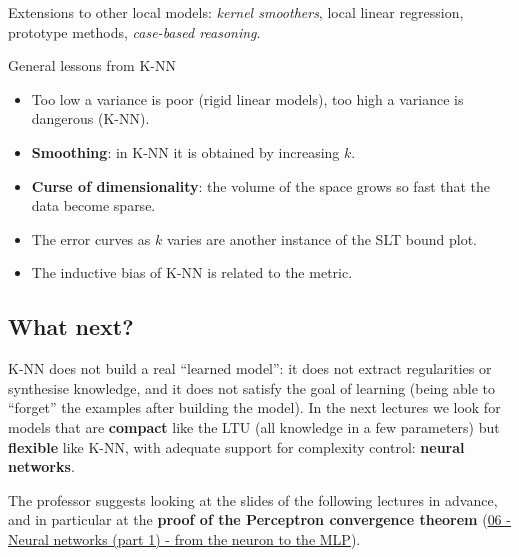 Extensions to other local models: \emph{kernel smoothers}, local linear
regression, prototype methods, \emph{case-based reasoning}.

\begin{boxabstract}{General lessons from K-NN}

\begin{itemize}
\tightlist
\item
  Too low a variance is poor (rigid linear models), too high a
  variance is dangerous (K-NN).
\item
  \textbf{Smoothing}: in K-NN it is obtained by increasing \(k\).
\item
  \textbf{Curse of dimensionality}: the volume of the space grows so
  fast that the data become sparse.
\item
  The error curves as \(k\) varies are another instance of the SLT
  bound plot.
\item
  The inductive bias of K-NN is related to the metric.
\end{itemize}

\end{boxabstract}

\subsection{What next?}\label{e-adesso}

K-NN does not build a real ``learned model'': it does not extract
regularities or synthesise knowledge, and it does not satisfy the goal
of learning (being able to ``forget'' the examples after building the
model). In the next lectures we look for models that are
\textbf{compact} like the LTU (all knowledge in a few parameters) but
\textbf{flexible} like K-NN, with adequate support for complexity
control: \textbf{neural networks}.

The professor suggests looking at the slides of the following lectures
in advance, and in particular at the \textbf{proof of the Perceptron
convergence theorem}
(\href{06\%20-\%20Reti\%20neurali\%20(parte\%201)\%20-\%20dal\%20neurone\%20al\%20MLP}{06
- Neural networks (part 1) - from the neuron to the MLP}).


